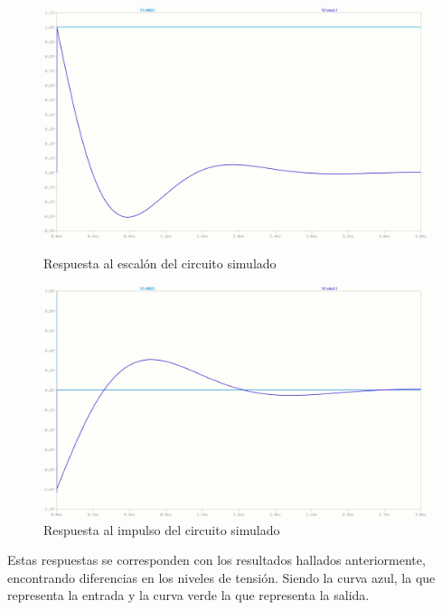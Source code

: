 \begin{figure}[hbt]
\begin{centering}

	\begin{minipage}[b]{.4\linewidth}
	\centering
	\includegraphics[width=1.1\linewidth]{imagenes/StepSimulacion}
	\caption{Respuesta al escal\'on del circuito simulado}
	\end{minipage}
	\hfill
	\begin{minipage}[b]{.4\linewidth}
	\centering
	\includegraphics[width=1.1\linewidth]{imagenes/ImpulseSimulacion}
	\caption{Respuesta al impulso del circuito simulado}
	\end{minipage}
\end{centering}
\end{figure}


Estas respuestas se corresponden con los resultados hallados anteriormente, encontrando diferencias en los niveles de tensi\'on. Siendo la curva azul, la  que representa la entrada y la curva verde la que representa la salida.

